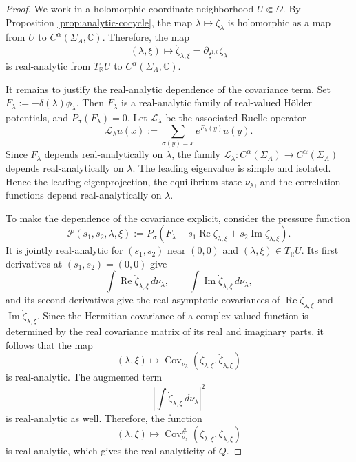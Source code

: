 \documentclass[11pt]{amsart}
\theoremstyle{plain}
\theoremstyle{definition}
\theoremstyle{remark}
\begin{document}
\begin{proof}
We work in a holomorphic coordinate neighborhood
$U\Subset\Omega$. By Proposition \ref{prop:analytic-cocycle}, the map
$\lambda\mapsto \zeta_\lambda
$ is holomorphic as a map from $U$ to
$C^\alpha(\Sigma_A,\mathbb C)$.
Therefore, the map
$$(\lambda,\xi)\mapsto \dot\zeta_{\lambda,\xi} =
\partial_{\xi^{1,0}}\zeta_\lambda
$$
is real-analytic from $T_{\mathbb R}U$ to $C^\alpha(\Sigma_A,\mathbb C)$. 

It remains to justify the real-analytic dependence of the covariance term.
Set
$F_\lambda:=-\delta(\lambda)\phi_\lambda.
$
Then $F_\lambda$ is a real-analytic family of real-valued H\"older potentials,
and
$P_\sigma(F_\lambda)=0.
$
Let $\mathcal L_\lambda$ be the associated Ruelle operator
$$
\mathcal L_\lambda u(x):=
\sum_{\sigma (y)=x}e^{F_\lambda(y)}u(y).
$$
Since $F_\lambda$ depends real-analytically on $\lambda$, the family
$\mathcal L_\lambda \colon C^\alpha(\Sigma_A)\to C^\alpha(\Sigma_A)$ depends
real-analytically on $\lambda$. The leading eigenvalue is simple and isolated.
Hence the leading eigenprojection, the equilibrium state $\nu_\lambda$, and
the correlation functions depend real-analytically on $\lambda$.

To make the dependence of the covariance explicit, consider the pressure function $$ \mathcal P(s_1,s_2,\lambda,\xi) := P_\sigma\left( F_\lambda +s_1\operatorname{Re}\dot\zeta_{\lambda,\xi} +s_2\operatorname{Im}\dot\zeta_{\lambda,\xi} \right). $$ It is jointly real-analytic for $(s_1,s_2)$ near $(0,0)$ and $(\lambda,\xi)\in T_{\mathbb R}U$. Its first derivatives at $(s_1,s_2)=(0,0)$ give $$ \int \operatorname{Re}\dot\zeta_{\lambda,\xi}\,d\nu_\lambda, \qquad \int \operatorname{Im}\dot\zeta_{\lambda,\xi}\,d\nu_\lambda,$$
and its second derivatives give the real asymptotic covariances of $\operatorname{Re}\dot\zeta_{\lambda,\xi}$ and $\operatorname{Im}\dot\zeta_{\lambda,\xi}$. Since the Hermitian covariance of a complex-valued function is determined by the real covariance matrix of its real and imaginary parts, it follows that the map
$$ (\lambda,\xi)\mapsto \operatorname{Cov}_{\nu_\lambda} (\dot\zeta_{\lambda,\xi},\dot\zeta_{\lambda,\xi}) $$ is real-analytic.
 The augmented term $$ \left|\int \dot\zeta_{\lambda,\xi}\,d\nu_\lambda\right|^2 $$ is real-analytic as well. Therefore, the function $$ (\lambda,\xi)\mapsto \operatorname{Cov}^{\#}_{\nu_\lambda} (\dot\zeta_{\lambda,\xi},\dot\zeta_{\lambda,\xi}) $$ is real-analytic, which gives the real-analyticity of $Q$.
\end{proof}
\end{document}
